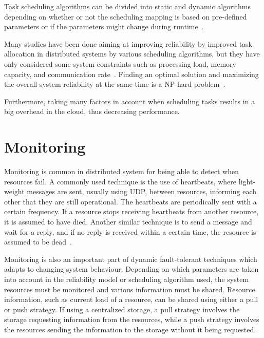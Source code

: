 \documentclass{cslthse-msc}
\begin{document}
Task scheduling algorithms can be divided into static and dynamic algorithms depending on whether or not the scheduling mapping is based on pre-defined parameters or if the parameters might change during runtime~\cite{schedReplicas}.

Many studies have been done aiming at improving reliability by improved task allocation in distributed systems by various scheduling algorithms, but they have only considered some system constraints such as processing load, memory capacity, and communication rate~\cite{optTaskAllocationForMaxRel}. Finding an optimal solution and maximizing the overall system reliability at the same time is a NP-hard problem~\cite{optTaskAllocationForMaxRel, taskAllocationSwarm, schedulingSurvey}.

Furthermore, taking many factors in account when scheduling tasks results in a big overhead in the cloud, thus decreasing performance. 


\section{Monitoring} \label{sec:background_monitoring}
Monitoring is common in distributed system for being able to detect when resources fail. A commonly used technique is the use of heartbeats, where light-weight messages are sent, usually using UDP, between resources, informing each other that they are still operational. The heartbeats are periodically sent with a certain frequency. If a resource stops receiving heartbeats from another resource, it is assumed to have died. Another similar technique is to send a message and wait for a reply, and if no reply is received within a certain time, the resource is assumed to be dead~\cite{probabilistic_recovery}.

Monitoring is also an important part of dynamic fault-tolerant techniques which adapts to changing system behaviour. Depending on which parameters are taken into account in the reliability model or scheduling algorithm used, the system resources must be monitored and various information must be shared. Resource information, such as current load of a resource, can be shared using either a pull or push strategy. If using a centralized storage, a pull strategy involves the storage requesting information from the resources, while a push strategy involves the resources sending the information to the storage without it being requested.
\end{document}
